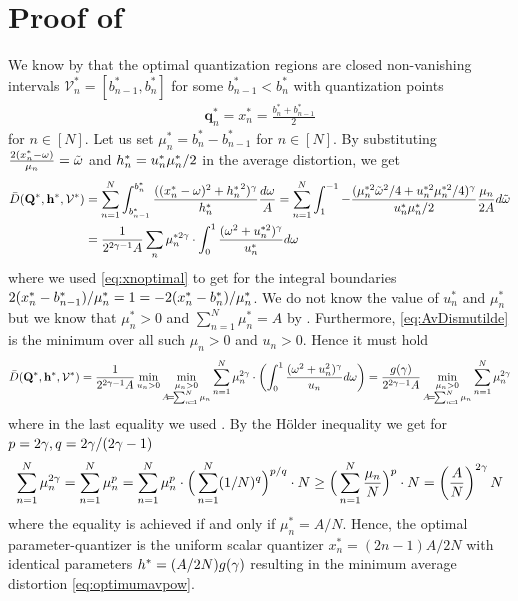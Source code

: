 \documentclass[12pt,onecolumn,journal,draftclsnofoot,letterpaper]{IEEEtran}
\renewcommand{\vp}{\mathbf q}
\renewcommand{\vP}{\mathbf Q}
\newcommand{\Vor}{\ensuremath{\mathcal{V}}}         %
\newcommand{\Dis}{\ensuremath{D}}                    %
\newcommand{\AvDis}{\ensuremath{\bar{\Dis}}}         %
\begin{document}
\section{Proof of }\label{sec:proof_theorem} 
  We know by  that the optimal quantization regions are closed non-vanishing
  intervals $\Vor_n^*=[b_{n-1}^*,b_n^*]$ for some $b^*_{n-1}<b_n^*$ with quantization points
  \begin{align}
   \vp_n^*= x_n^*=\frac{b^*_n+b^*_{n-1}}{2}\label{eq:xnoptimal}
  \end{align}
  for $n\in[N]$.
  Let us set $\mu_n^*=b_n^*-b_{n-1}^*$ for $n\in[N]$. By substituting $\frac{2(x_n^*-\omega)}{\mu_n}={  \tilde{\omega} }$ and
  $h^{*}_n=u^*_n \mu_n^*/2$  in the average distortion, we get 
  \begin{align}
    \AvDis(\vP^*,\vh^*,\Vor^*)&=\sum_{n=1}^N \int_{b_{n-1}^*}^{b_n^*} 
       \frac{ ((\pGlob_n-\ome)^2+{\hGlob_n}^2)^{\gam}}{\hGlob_n}\frac{d\ome}{A} 
       = \sum_{n=1}^N \int_{1}^{-1} -\frac{  (\mu_n^{*2} \tome^2/4 + u_n^{*2}\mu_n^{*2}/4)^{\gam}}{u_n^* \mu_n^*/2}
    \frac{\mu_n}{2A}d\tome\notag\\
    &= \frac{1}{ 2^{2\gam-1}A}\sum_n \mu_n^{*2\gam}\cdot\int_0^1 \frac{(\ome^2+u^{*2}_n)^{\gam}}{u^*_n}d
    \ome\label{eq:AvDismutilde} 
  \end{align}
  where we used \eqref{eq:xnoptimal} to get for the integral boundaries
  $2(x^{*}_n-b_{n-1}^*)/\mu_n^*=1=-2(x^{*}_n-b_{n}^*)/\mu^*_n$.  We do not know the value of $u^*_n$ and $\mu_n^*$ but
  we know that $\mu_n^*>0$ and $\sum_{n=1}^N\mu_n^*=A$ by . Furthermore, \eqref{eq:AvDismutilde} is
  the minimum over all such  $\mu_n>0$ and $u_n>0$. Hence it must hold
  \begin{align}
    \AvDis(\vP^*,\vh^*,\Vor^*)
    = \frac{1}{2^{2\gam-1}A} \min_{u_n>0} \min_{\substack{\mu_n>0\\ A\!=\! \sum_{n\!=\!1}^N \mu_n}} 
    \sum_{n=1}^N \mu_n^{2\gam}\cdot\left(\int_0^1 
      \frac{(\ome^2+u^2_n)^{\gam}}{u_n}d \ome\right)
      = \frac{g(\gam)}{2^{2\gam-1}A}  
         \min_{\substack{\mu_n>0\\ A\!=\! \sum_{n\!=\!1}^N \mu_n}} \sum_{n=1}^N \mu_n^{2\gam}  \notag
  \end{align}
  where in the last equality we used . 
  By the Hölder inequality we get for $p=2\gamma, q=2\gamma/(2\gamma-1)$ 
  \begin{align}
    \sum_{n=1}^N \mu_n^{2\gamma}=\sum_{n=1}^N \mu_n^p  = \sum_{n=1}^N \mu_n^p \cdot\Big(\sum_{n=1}^N (1/N)^q \Big)^{p/q} \cdot N
    \geq\Big( \sum_{n=1}^N \frac{\mu_n }{N}\Big)^p \cdot N =
    \left(\frac{A}{N}\right)^{2\gamma}N\notag
  \end{align}
  where the equality is achieved if and only if $\mu_n^*=A/N$. Hence, the optimal parameter-quantizer is the 
  uniform scalar quantizer $x_n^*=(2n-1)A/2N$ with identical parameters $h^*=(A/2N)g(\gamma)$ resulting in the
  minimum average distortion \eqref{eq:optimumavpow}.
\end{document}
